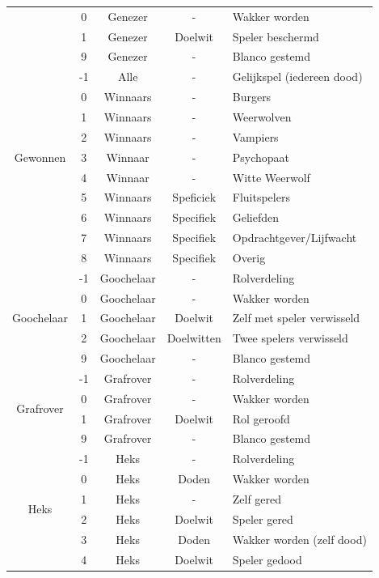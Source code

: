 \documentclass[12pt]{article}
\begin{document}
\begin{center}
\begin{longtable}{c|c|c|c|l}
       & 0 & Genezer & - & Wakker worden \\
       & 1 & Genezer & Doelwit & Speler beschermd \\
       & 9 & Genezer & - & Blanco gestemd \\
      \hline
      \multirow{9}{*}{Gewonnen} & -1 & Alle & - & Gelijkspel (iedereen dood) \\
       & 0 & Winnaars & - & Burgers \\
       & 1 & Winnaars & - & Weerwolven \\
       & 2 & Winnaars & - & Vampiers \\
       & 3 & Winnaar & - & Psychopaat \\
       & 4 & Winnaar & - & Witte Weerwolf \\
       & 5 & Winnaars & Speficiek & Fluitspelers \\
       & 6 & Winnaars & Specifiek & Geliefden \\
       & 7 & Winnaars & Specifiek & Opdrachtgever/Lijfwacht \\
       & 8 & Winnaars & Specifiek & Overig \\
      \hline
      \multirow{5}{*}{Goochelaar} & -1 & Goochelaar & - & Rolverdeling \\
       & 0 & Goochelaar & - & Wakker worden \\
       & 1 & Goochelaar & Doelwit & Zelf met speler verwisseld \\
       & 2 & Goochelaar & Doelwitten & Twee spelers verwisseld \\
       & 9 & Goochelaar & - & Blanco gestemd \\
      \hline
      \multirow{4}{*}{Grafrover} & -1 & Grafrover & - & Rolverdeling \\
       & 0 & Grafrover & - & Wakker worden \\
       & 1 & Grafrover & Doelwit & Rol geroofd \\
       & 9 & Grafrover & - & Blanco gestemd \\
      \hline
      \multirow{8}{*}{Heks} & -1 & Heks & - & Rolverdeling \\
       & 0 & Heks & Doden & Wakker worden \\
       & 1 & Heks & - & Zelf gered \\
       & 2 & Heks & Doelwit & Speler gered \\
       & 3 & Heks & Doden & Wakker worden (zelf dood) \\
       & 4 & Heks & Doelwit & Speler gedood \\

\end{longtable}
\end{center}
\end{document}

